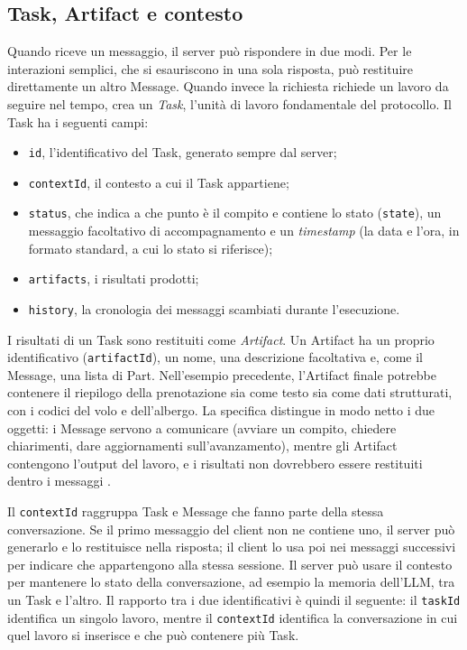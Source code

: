 \subsection{Task, Artifact e contesto}

Quando riceve un messaggio, il server può rispondere in due modi. Per le interazioni semplici, che si esauriscono in una sola risposta, può restituire direttamente un altro Message. Quando invece la richiesta richiede un lavoro da seguire nel tempo, crea un \emph{Task}, l'unità di lavoro fondamentale del protocollo. Il Task ha i seguenti campi:

\begin{itemize}
    \item \texttt{id}, l'identificativo del Task, generato sempre dal server;
    \item \texttt{contextId}, il contesto a cui il Task appartiene;
    \item \texttt{status}, che indica a che punto è il compito e contiene lo stato (\texttt{state}), un messaggio facoltativo di accompagnamento e un \emph{timestamp}
                             (la data e l'ora, in formato standard, a cui lo stato si riferisce);
    \item \texttt{artifacts}, i risultati prodotti;
    \item \texttt{history}, la cronologia dei messaggi scambiati durante l'esecuzione.
\end{itemize}

I risultati di un Task sono restituiti come \emph{Artifact}. Un Artifact ha un proprio identificativo (\texttt{artifactId}), un nome, 
una descrizione facoltativa e, come il Message, una lista di Part. Nell'esempio precedente, l'Artifact finale potrebbe contenere il riepilogo della prenotazione sia come testo sia come dati strutturati, con i codici del volo e dell'albergo. La specifica distingue in modo netto i due oggetti: i Message servono a comunicare (avviare un compito, chiedere chiarimenti, dare aggiornamenti sull'avanzamento), mentre gli Artifact contengono l'output del lavoro, e i risultati non dovrebbero essere restituiti dentro i messaggi \cite{a2aspec}.

Il \texttt{contextId} raggruppa Task e Message che fanno parte della stessa conversazione. Se il primo messaggio del client non ne contiene uno, 
il server può generarlo e lo restituisce nella risposta; il client lo usa poi nei messaggi successivi per indicare che appartengono alla stessa sessione. 
Il server può usare il contesto per mantenere lo stato della conversazione, ad esempio la memoria dell'LLM, tra un Task e l'altro. Il rapporto tra i due 
identificativi è quindi il seguente: il \texttt{taskId} identifica un singolo lavoro, mentre il \texttt{contextId} identifica la conversazione in cui quel 
lavoro si inserisce e che può contenere più Task.

